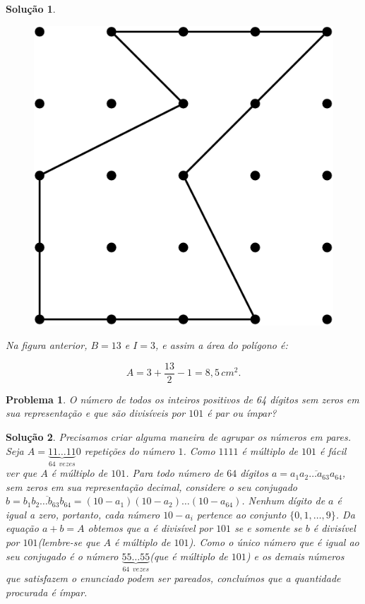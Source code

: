 \documentclass{hipatia}
\newtheorem{problem*}{Problema}
\newtheorem*{solution*}{Solução}
\begin{document}
\begin{solution*}
\begin{figure}[htbp]
	\centering
		\includegraphics[scale=0.3]{F58.png}
\end{figure} 

\noindent Na figura anterior, $B=13$ e $I=3$, e assim a área do polígono é:

$$A = 3 + \dfrac{13}{2}-1 = 8,5\,cm^2.$$ 

\end{solution*}


\begin{problem*}
O número de todos os inteiros positivos de 64 dígitos sem zeros em sua representação e que são divisíveis por $101$ é par ou ímpar?
\end{problem*}

\begin{solution*}
	Precisamos criar alguma maneira de agrupar os números em pares. Seja $A = \underbrace{11 \ldots 11}_{64\,\,\, vezes}0$ repetições do número $1$. Como $1111$ é múltiplo de $101$ é fácil ver que  $A$ é múltiplo de $101$. Para todo número de $64$ dígitos $a=\overline{a_1a_2\ldots a_{63}a_{64}}$, sem zeros em sua representação decimal, considere o seu conjugado $b = \overline{b_1b_2\ldots b_{63}b_{64}} = (10-a_1)(10-a_2) \ldots (10-a_{64})$. Nenhum dígito de $a$ é igual a zero, portanto, cada número $10-a_i$ pertence ao conjunto $\{0,1,\ldots, 9\}$. Da equação $a+b=A$ obtemos que $a$ é divisível por $101$ se e somente se $b$ é divisível por $101$(lembre-se que $A$ é múltiplo de $101$). Como o único número que é igual ao seu conjugado é o número $\underbrace{55 \ldots 55}_{64\,\,\, vezes}$(que é múltiplo de $101$) e os demais números que satisfazem o enunciado podem ser pareados, concluímos que a quantidade procurada é ímpar.
\end{solution*}
\end{document}
